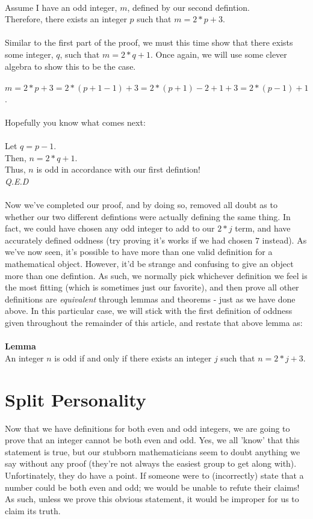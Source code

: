 \documentclass[a4paper,12pt]{article}
\begin{document}
\\
Assume I have an odd integer, $m$, defined by our second defintion.\\
Therefore, there exists an integer $p$ such that $m = 2*p + 3$.\\
\\
Similar to the first part of the proof, we must this time show that there exists some integer, $q$, such that $m = 2*q + 1$. Once again, we will use some clever algebra to show this to be the case.\\
\\
$m = 2*p + 3 = 2*(p + 1 - 1) + 3 = 2*(p + 1) - 2+1 + 3 = 2*(p - 1) + 1$.\\
\\
Hopefully you know what comes next:\\
\\
Let $q = p - 1$.\\
Then, $n = 2*q + 1$.\\
Thus, $n$ is odd in accordance with our first defintion!\\
\textit{Q.E.D}\\
\\
Now we've completed our proof, and by doing so, removed all doubt as to whether our two different defintions were actually defining the same thing. In fact, we could have chosen any odd integer to add to our $2*j$ term, and have accurately defined oddness (try proving it's works if we had chosen $7$ instead). As we've now seen, it's possible to have more than one valid definition for a mathematical object. However, it'd be strange and confusing to give an object more than one defintion. As such, we normally pick whichever definition we feel is the most fitting (which is sometimes just our favorite), and then prove all other definitions are \textit{equivalent} through lemmas and theorems - just as we have done above. In this particular case, we will stick with the first definition of oddness given throughout the remainder of this article, and restate that above lemma as:\\
\\
\textbf{Lemma}\\
An integer $n$ is odd if and only if there exists an integer $j$ such that $n = 2*j + 3$.   

\section{Split Personality}
Now that we have definitions for both even and odd integers, we are going to prove that an integer cannot be both even and odd. Yes, we all 'know' that this statement is true, but our stubborn mathematicians seem to doubt anything we say without any proof (they're not always the easiest group to get along with). Unfortinately, they do have a point. If someone were to (incorrectly) state that a number could be both even and odd; we would be unable to refute their claims! As such, unless we prove this obvious statement, it would be improper for us to claim its truth.
\end{document}
